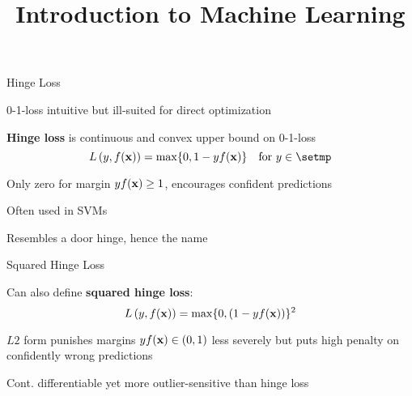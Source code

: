 \documentclass[11pt,compress,t,notes=noshow, xcolor=table]{beamer}
\title{Introduction to Machine Learning}
\begin{document}
    

\begin{framei}[sep=M]{Hinge Loss}

  \item 0-1-loss intuitive but ill-suited for direct optimization
  \item \textbf{Hinge loss} is continuous and convex 
  upper bound on 0-1-loss 
  $$\Lxy = \max \{ 0, 1 - y\fx \} \quad \text{for} \ y \in \setmp$$
  \item Only zero for margin $yf(\mathbf{x})\geq 1$, 
  encourages confident predictions
  \item Often used in SVMs %
  \item Resembles a door hinge, hence the name



\end{framei}


\begin{framei}[sep=M]{Squared Hinge Loss}

  \item Can also define \textbf{squared hinge loss}:
  $$L\left(y, f(\mathbf{x})\right) = \max \{ 0, (1 - yf(\mathbf{x}))\}^2$$
  \item $L2$ form punishes margins $yf(\mathbf{x}) \in (0, 1)$ less severely but puts high penalty on confidently wrong predictions
  \item Cont. differentiable yet more outlier-sensitive than hinge loss



\end{framei}
\end{document}
